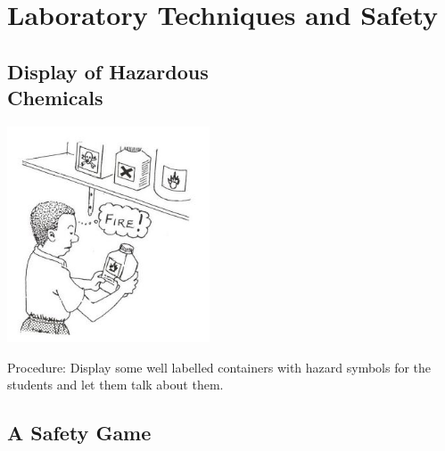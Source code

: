 \section{Laboratory Techniques and Safety}

\begin{multicols}{2}




\subsection{Display of Hazardous \hfill \\ Chemicals}

\begin{center}
\includegraphics[width=0.45\textwidth]{./img/source/display-chemicals.jpg}
\end{center}

\begin{description*}
\item[Procedure:]{Display some well labelled containers with
hazard symbols for the students and let them
talk about them.}
\end{description*}

\subsection{A Safety Game}


\end{multicols}

